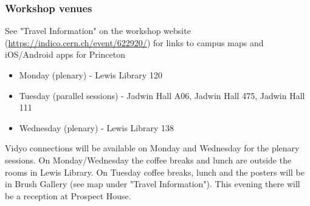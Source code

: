 \begin{frame}
\frametitle{Workshop venues}
See "Travel Information" on the workshop website (\url{https://indico.cern.ch/event/622920/}) for links to campus maps and iOS/Android apps for Princeton
\vskip 0.15in
\begin{itemize}
\item Monday (plenary) - Lewis Library 120 
\item Tuesday (parallel sessions) - Jadwin Hall A06,  Jadwin Hall 475, Jadwin Hall 111
\item Wednesday (plenary) - Lewis Library 138
\end{itemize}
Vidyo connections will be available on Monday and Wednesday for the plenary sessions.
\vskip 0.15in
On Monday/Wednesday the coffee breaks and lunch are outside the rooms in Lewis Library. On Tuesday coffee breaks, lunch and the posters will be in Brush Gallery (see map under "Travel Information"). This evening there will be a reception at Prospect House.
\end{frame}


